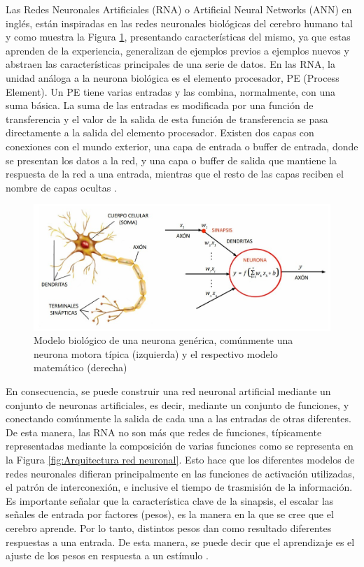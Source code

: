 Las Redes Neuronales Artificiales (RNA) o Artificial Neural Networks (ANN) en inglés, están inspiradas en las redes neuronales biológicas del cerebro humano tal y como muestra la Figura \ref{fig:Modelo neurona}, presentando características del mismo, ya que estas aprenden de la experiencia, generalizan de ejemplos previos a ejemplos nuevos y abstraen las características principales de una serie de datos. En las RNA, la unidad análoga a la neurona biológica es el elemento procesador, PE (Process Element). Un PE tiene varias entradas y las combina, normalmente, con una suma básica. La suma de las entradas es modificada por una función de transferencia y el valor de la salida de esta función de transferencia se pasa directamente a la salida del elemento procesador. Existen dos capas con conexiones con el mundo exterior, una capa de entrada o buffer de entrada, donde se presentan los datos a la red, y una capa o buffer de salida que mantiene la respuesta de la red a una entrada, mientras que el resto de las capas reciben el nombre de capas ocultas \cite{Basogain08}.\\

\begin{figure} [H]
    \begin{center}
      \includegraphics[width=12cm]{figs/Modelo neurona.jpeg}
    \end{center}
    \caption{Modelo biológico de una neurona genérica, comúnmente una neurona motora típica (izquierda) y el respectivo modelo matemático (derecha)}
    \label{fig:Modelo neurona}
\end{figure}

En consecuencia, se puede construir una red neuronal artificial mediante un conjunto de neuronas artificiales, es decir, mediante un conjunto de funciones, y conectando comúnmente la salida de cada una a las entradas de otras diferentes. De esta manera, las RNA no son más que redes de funciones, típicamente representadas mediante la composición de varias funciones como se representa en la Figura \ref{fig:Arquitectura red neuronal}. Esto hace que los diferentes modelos de redes neuronales difieran principalmente en las funciones de activación utilizadas, el patrón de interconexión, e inclusive el tiempo de trasmisión de la información. Es importante señalar que la característica clave de la sinapsis, el escalar las señales de entrada por factores (pesos), es la manera en la que se cree que el cerebro aprende. Por lo tanto, distintos pesos dan como resultado diferentes respuestas a una entrada. De esta manera, se puede decir que el aprendizaje es el ajuste de los pesos en respuesta a un estímulo \cite{Dinamarca18}.\\

